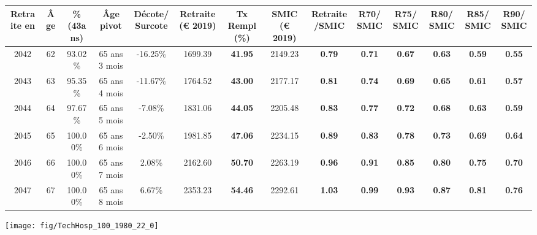 \begin{adjustbox}{max width=\textwidth} 
\begin{tabular}[htb]{|c|c||c|c|c||c|c||c|c||c|c|c|c|c|} 
\hline 
 Retraite en &  Âge &  \%(43ans) &  Âge pivot &  Décote/Surcote &  Retraite (\euro{} 2019) &  Tx Rempl(\%) &  SMIC (\euro{} 2019) &  Retraite/SMIC &  R70/SMIC &  R75/SMIC &  R80/SMIC &  R85/SMIC &  R90/SMIC \\ 
\hline \hline 
 2042 &  62 &  93.02\% &  65 ans 3 mois &  -16.25\% &  1699.39 &  {\bf 41.95} &  2149.23 &  {\bf {\color{red} 0.79}} &  {\bf {\color{red} 0.71}} &  {\bf {\color{red} 0.67}} &  {\bf {\color{red} 0.63}} &  {\bf {\color{red} 0.59}} &  {\bf {\color{red} 0.55}} \\ 
\hline 
 2043 &  63 &  95.35\% &  65 ans 4 mois &  -11.67\% &  1764.52 &  {\bf 43.00} &  2177.17 &  {\bf {\color{red} 0.81}} &  {\bf {\color{red} 0.74}} &  {\bf {\color{red} 0.69}} &  {\bf {\color{red} 0.65}} &  {\bf {\color{red} 0.61}} &  {\bf {\color{red} 0.57}} \\ 
\hline 
 2044 &  64 &  97.67\% &  65 ans 5 mois &  -7.08\% &  1831.06 &  {\bf 44.05} &  2205.48 &  {\bf {\color{red} 0.83}} &  {\bf {\color{red} 0.77}} &  {\bf {\color{red} 0.72}} &  {\bf {\color{red} 0.68}} &  {\bf {\color{red} 0.63}} &  {\bf {\color{red} 0.59}} \\ 
\hline 
 2045 &  65 &  100.00\% &  65 ans 6 mois &  -2.50\% &  1981.85 &  {\bf 47.06} &  2234.15 &  {\bf {\color{red} 0.89}} &  {\bf {\color{red} 0.83}} &  {\bf {\color{red} 0.78}} &  {\bf {\color{red} 0.73}} &  {\bf {\color{red} 0.69}} &  {\bf {\color{red} 0.64}} \\ 
\hline 
 2046 &  66 &  100.00\% &  65 ans 7 mois &  2.08\% &  2162.60 &  {\bf 50.70} &  2263.19 &  {\bf {\color{red} 0.96}} &  {\bf {\color{red} 0.91}} &  {\bf {\color{red} 0.85}} &  {\bf {\color{red} 0.80}} &  {\bf {\color{red} 0.75}} &  {\bf {\color{red} 0.70}} \\ 
\hline 
 2047 &  67 &  100.00\% &  65 ans 8 mois &  6.67\% &  2353.23 &  {\bf 54.46} &  2292.61 &  {\bf 1.03} &  {\bf {\color{red} 0.99}} &  {\bf {\color{red} 0.93}} &  {\bf {\color{red} 0.87}} &  {\bf {\color{red} 0.81}} &  {\bf {\color{red} 0.76}} \\ 
\hline 
\hline 
\end{tabular} 
\end{adjustbox} 
 
 \vspace{0.1cm} 

 {\hspace{-2.2cm}\texttt{[image: fig/TechHosp\_100\_1980\_22\_0]}} 

